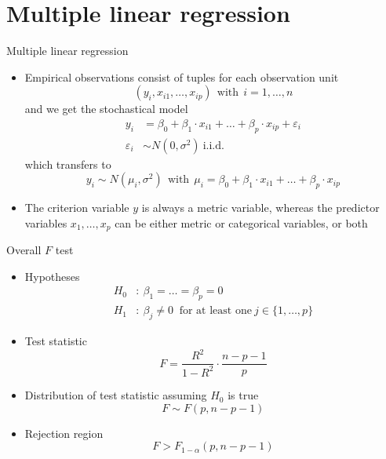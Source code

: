 \documentclass[aspectratio=169]{beamer}
\begin{document}
\section{Multiple linear regression}

\begin{frame}{Multiple linear regression}
  \begin{itemize}
    \item Empirical observations consist of tuples for each observation
      unit
\[
  (y_i, x_{i1}, \ldots, x_{ip}) ~~\text{with}~~ i = 1, \ldots, n
\]
and we get the stochastical model
\begin{align*}
  y_i & = \beta_0 + \beta_1 \cdot x_{i1} + \ldots + \beta_p \cdot x_{ip} +
        \varepsilon_i \\
  \varepsilon_i & \sim N (0, \sigma^2)~\text{i.i.d.}
\end{align*}
which transfers to
\[
  y_i \sim N (\mu_i, \sigma^2) ~~\text{with}~~
  \mu_i = \beta_0 + \beta_1 \cdot x_{i1} + \ldots + \beta_p \cdot x_{ip}
\]\vspace{-.7cm}
\item The criterion variable $y$ is always a metric variable, whereas the
  predictor variables $x_1, \ldots, x_p$ can be either metric or
      categorical variables, or both
  \end{itemize}
\end{frame}

\begin{frame}{Overall $F$ test}
  \begin{itemize}
    \item Hypotheses
\begin{align*}
  H_0&\colon~ \beta_1 = \ldots = \beta_p = 0\\
  H_1&\colon~ \beta_j \neq 0 ~\text{ for at least one}~ j \in
  \{1, \ldots, p\}
\end{align*}
\item Test statistic
\[
  F = \frac{R^2}{1 - R^2} \cdot \frac{n - p - 1}{p}
\]
\item Distribution of test statistic assuming $H_0$ is true
\[
  F \sim F(p, n - p - 1)
\]
\item Rejection region
\[
  F > F_{1-\alpha} (p, n - p - 1)
\]
  \end{itemize}
\end{frame}
\end{document}
